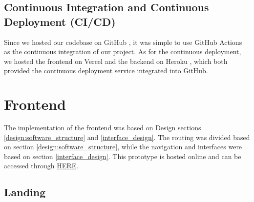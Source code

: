 \subsection{Continuous Integration and Continuous Deployment (CI/CD)}

Since we hosted our codebase on GitHub \cite{github}, it was simple to use GitHub Actions \cite{githubactions} as the continuous integration of our project. As for the continuous deployment, we hosted the frontend on Vercel \cite{vercel} and the backend on Heroku \cite{heroku}, which both provided the continuous deployment service integrated into GitHub.









\section{Frontend}
The implementation of the frontend was based on Design sections \ref{design:software_structure} and \ref{interface_design}. The routing was divided based on section \ref{design:software_structure}, while the navigation and interfaces were based on section \ref{interface_design}.
This prototype is hosted online and can be accessed through \href{https://resource-based-checklist-generation.vercel.app/}{HERE}.

\subsection{Landing}
\label{im:landing}


